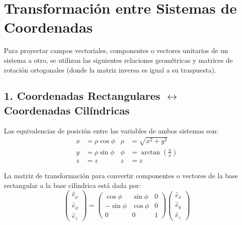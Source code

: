 \documentclass[11pt, a4paper]{article}
\begin{document}
\vspace{0.5cm}

\section{Transformación entre Sistemas de Coordenadas}

Para proyectar campos vectoriales, componentes o vectores unitarios de un sistema a otro, se utilizan las siguientes relaciones geométricas y matrices de rotación ortogonales (donde la matriz inversa es igual a su traspuesta).

\subsection{1. Coordenadas Rectangulares $\leftrightarrow$ Coordenadas Cilíndricas}

Las equivalencias de posición entre las variables de ambos sistemas son:
\begin{align*}
    x &= \rho\cos\phi & \rho &= \sqrt{x^2+y^2} \\
    y &= \rho\sin\phi & \phi &= \arctan\left(\frac{y}{x}\right) \\
    z &= z            & z    &= z
\end{align*}

La matriz de transformación para convertir componentes o vectores de la base rectangular a la base cilíndrica está dada por:
\begin{equation*}
    \begin{pmatrix} \hat{e}_\rho \\ \hat{e}_\phi \\ \hat{e}_z \end{pmatrix} = 
    \begin{pmatrix} 
        \cos\phi & \sin\phi & 0 \\ 
        -\sin\phi & \cos\phi & 0 \\ 
        0 & 0 & 1 
    \end{pmatrix}
    \begin{pmatrix} \hat{e}_x \\ \hat{e}_y \\ \hat{e}_z \end{pmatrix}
\end{equation*}
\end{document}
